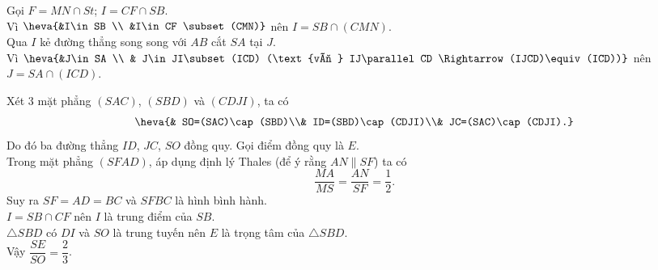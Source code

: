 \begin{bt}
{\begin{listEX}
			Gọi $ F=MN\cap St $; $ I=CF\cap SB $.\\
			Vì $ \heva{&I\in SB \\ &I\in CF \subset (CMN)} $ nên $ I=SB\cap (CMN) $.\\
			Qua $ I $ kẻ đường thẳng song song với $ AB $  cắt $ SA $ tại $ J $.\\
			Vì $ \heva{&J\in SA \\ & J\in JI\subset (ICD) (\text{vì } IJ\parallel CD \Rightarrow (IJCD)\equiv (ICD))} $ nên $ J=SA\cap (ICD) $.
			\item Xét $ 3 $ mặt phẳng $ (SAC) $, $ (SBD) $ và $ (CDJI) $, ta có
			$$\heva{& SO=(SAC)\cap (SBD)\\& ID=(SBD)\cap (CDJI)\\& JC=(SAC)\cap (CDJI).}$$
			Do đó ba đường thẳng $ ID $, $ JC $, $ SO $ đồng quy. Gọi điểm đồng quy là $ E $.\\
			Trong mặt phẳng $ (SFAD) $, áp dụng định lý Thales (để ý rằng $ AN\parallel SF $) ta có
			\[ \dfrac{MA}{MS}=\dfrac{AN}{SF}=\dfrac{1}{2}. \]
			Suy ra $ SF=AD=BC $ và $ SFBC $ là hình bình hành.\\
			$ I=SB\cap CF $ nên $ I $ là trung điểm của $ SB $.\\
			$ \triangle SBD $ có $ DI $ và $ SO $ là trung tuyến nên $ E $ là trọng tâm của $ \triangle SBD $.\\
			Vậy $ \dfrac{SE}{SO}=\dfrac{2}{3} $.
		\end{listEX}
	}
\end{bt}


